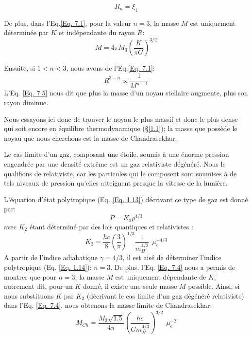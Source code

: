 \begin{equation}R_{n}=\xi_{1}\label{Eq. 7.3}\end{equation}

De plus, dans l'Eq.\ref{Eq. 7.1}, pour la valeur $n=3$, la masse $M$ est uniquement déterminée par $K$ et indépendante du rayon $R$: 
\begin{equation}M=4\pi M_{3}\left(\dfrac{K}{\pi G}\right)^{3/2}\label{Eq. 7.4}\end{equation}

Ensuite, si $1<n<3$, nous avons de l'Eq.\ref{Eq. 7.1}:
\begin{equation}R^{3-n}\propto\dfrac{1}{M^{n-1}}\label{Eq. 7.5}\end{equation} L'Eq. \ref{Eq. 7.5} nous dit que plus la masse d'un noyau stellaire augmente, plus son rayon diminue.\smallskip 

Nous essayons ici donc de trouver le noyau le plus massif et donc le plus dense qui soit encore en équilibre thermodynamique (§\ref{1.1}); la masse que possède le noyau que nous cherchons est la masse de Chandrasekhar.\smallskip

Le cas limite d'un gaz, composant une étoile, soumis à une énorme pression engendrée par une densité extrême est un gaz relativiste dégénéré. Nous le qualifions de relativiste, car les particules qui le composent sont soumises à de tels niveaux de pression qu'elles atteignent presque la vitesse de la lumière.\smallskip

L'équation d'état polytropique (Eq. \ref{Eq. 1.13}) décrivant ce type de gaz est donné par:\begin{equation}P=K_{2}  \rho^{4/3}\label{Eq.7.6}\end{equation}
avec $K_{2}$ étant déterminé par des lois quantiques et relativistes \autocite{prialnikIntroductionTheoryStellar2009}:
\begin{equation}K_{2}=\dfrac{hc}{8}\left(\dfrac{3}{\pi}\right)^{1/3} \dfrac{1}{m_{H}^{4/3}}\hspace{5pt}\mu_e^{-4/3}\label{Eq. 7.7}\end{equation}
A partir de l'indice adiabatique $\gamma = 4/3$, il est aisé de déterminer l'indice polytropique (Eq. \ref{Eq. 1.14}): $n=3$. De plus, l'Eq. \ref{Eq. 7.4} nous a permis de montrer que pour $n=3$, la masse $M$ est uniquement dépendante de $K$; autrement dit, pour un $K$ donné, il existe une seule masse $M$ possible. Ainsi, si nous substituons $K$ par $K_{2}$ (décrivant le cas limite d'un gaz dégénéré relativiste) dans l'Eq. \ref{Eq. 7.4}, nous obtenons la masse limite de Chandrasekhar: \begin{equation}M_{Ch}=\dfrac{M_{3}\sqrt{1.5}}{4\pi}\left( \dfrac{hc}{Gm_{H}^{4/3}}\right)^{3/2}\hspace{5pt}\mu_{e}^{-2}\label{Eq. 7.8}\end{equation}

